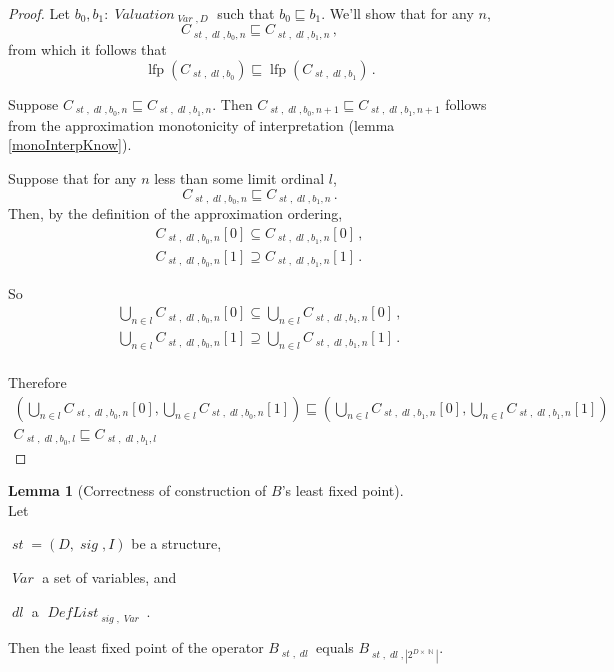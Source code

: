 \documentclass[oneside,12pt]{book}
\theoremstyle{definition}
\newtheorem{lemma}[theorem]{Lemma}
\theoremstyle{remark}
\newcommand\var[1]{\mathop{\mathit{#1}}\nolimits}
\newcommand{\approximates}{\sqsubseteq}
\newcommand{\sig}{\var{sig}}
\newcommand{\st}{\var{st}}
\newcommand{\Var}{\var{Var}}
\DeclareMathOperator{\lfp}{lfp}
\newcommand{\Valuation}{\var{Valuation}}
\newcommand{\DefList}{\var{DefList}}
\newcommand{\dl}{\var{dl}}
\newcommand{\Nat}{\var{\mathbb{N}}}
\begin{document}
\begin{proof}
  Let $b_0, b_1\colon \Valuation_{\Var,D}$ such that $b_0 \approximates b_1$.
  We'll show that for any $n$,
  \[C_{\st,\dl,b_0,n} \approximates C_{\st,\dl,b_1,n}\,,\]
  from which it follows that
  \[\lfp(C_{\st,\dl,b_0}) \approximates \lfp(C_{\st,\dl,b_1})\,.\]
  
  Suppose $C_{\st,\dl,b_0,n} \approximates C_{\st,\dl,b_1,n}$. Then
  $C_{\st,\dl,b_0,n+1} \approximates C_{\st,\dl,b_1,n+1}$ follows from
  the approximation monotonicity of interpretation (lemma \ref{monoInterpKnow}).
  
  Suppose that for any $n$ less than some limit ordinal $l$,
  \[C_{\st,\dl,b_0,n} \approximates C_{\st,\dl,b_1,n}\,.\]
  Then, by the definition of the approximation ordering,
  \begin{gather*}
    C_{\st,\dl,b_0,n}[0] \subseteq C_{\st,\dl,b_1,n}[0]\,,\\
    C_{\st,\dl,b_0,n}[1] \supseteq C_{\st,\dl,b_1,n}[1]\,.
  \end{gather*}
  
  So
  \begin{gather*}
    \bigcup_{n \in l}C_{\st,\dl,b_0,n}[0] \subseteq
      \bigcup_{n \in l}C_{\st,\dl,b_1,n}[0]\,,\\
    \bigcup_{n \in l}C_{\st,\dl,b_0,n}[1] \supseteq
      \bigcup_{n \in l}C_{\st,\dl,b_1,n}[1]\,.\\
  \end{gather*}
  
  Therefore
  \begin{gather*}
    (\bigcup_{n \in l}C_{\st,\dl,b_0,n}[0], \bigcup_{n \in l}C_{\st,\dl,b_0,n}[1])
      \approximates
    (\bigcup_{n \in l}C_{\st,\dl,b_1,n}[0], \bigcup_{n \in l}C_{\st,\dl,b_1,n}[1])\\
    C_{\st,\dl,b_0,l} \approximates C_{\st,\dl,b_1,l}
  \end{gather*}
\end{proof}

\begin{lemma}[Correctness of construction of $B$'s least fixed point] \hfill \\
  Let
  \begin{compactitem}
    \item $\st = (D, \sig, I)$ be a structure,
    \item $\Var$ a set of variables, and
    \item $\dl$ a $\DefList_{\sig,\Var}$.
  \end{compactitem}
  
  \medskip \noindent Then the least fixed point of the operator $B_{\st,\dl}$
  equals $B_{\st,\dl,|2^{D \times \Nat}|}$.
\end{lemma}
\end{document}
